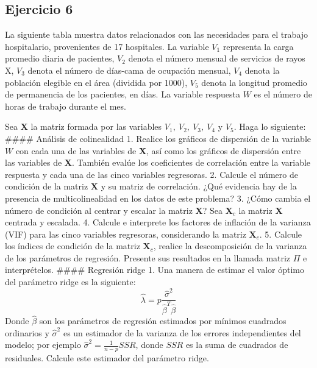 \documentclass[11pt]{article}
\begin{document}
    \hypertarget{ejercicio-6}{%
\subsection{Ejercicio 6}\label{ejercicio-6}}

La siguiente tabla muestra datos relacionados con las necesidades para
el trabajo hospitalario, provenientes de 17 hospitales. La variable
\(V_1\) representa la carga promedio diaria de pacientes, \(V_2\) denota
el número mensual de servicios de rayos X, \(V_3\) denota el número de
días-cama de ocupación mensual, \(V_4\) denota la población elegible en
el área (dividida por 1000), \(V_5\) denota la longitud promedio de
permanencia de los pacientes, en días. La variable respuesta \(W\) es el
número de horas de trabajo durante el mes.

Sea \(\mathbf{X}\) la matriz formada por las variables
\(V_1,\ V_2,\ V_3,\ V_4\) y \(V_5\). Haga lo siguiente: \#\#\#\#
Análisis de colinealidad 1. Realice los gráficos de dispersión de la
variable \(W\) con cada una de las variables de \(\mathbf{X}\), así como
los gráficos de dispersión entre las variables de \(\mathbf{X}\).
También evalúe los coeficientes de correlación entre la variable
respuesta y cada una de las cinco variables regresoras. 2. Calcule el
número de condición de la matriz \(\mathbf{X}\) y su matriz de
correlación. ¿Qué evidencia hay de la presencia de multicolinealidad en
los datos de este problema? 3. ¿Cómo cambia el número de condición al
centrar y escalar la matriz \(\mathbf{X}\)? Sea \(\mathbf{X}_c\) la
matriz \(\mathbf{X}\) centrada y escalada. 4. Calcule e interprete los
factores de inflación de la varianza (VIF) para las cinco variables
regresoras, considerando la matriz \(\mathbf{X}_c\). 5. Calcule los
índices de condición de la matriz \(\mathbf{X}_c\), realice la
descomposición de la varianza de los parámetros de regresión. Presente
sus resultados en la llamada matriz \(\Pi\) e interprételos. \#\#\#\#
Regresión ridge 1. Una manera de estimar el valor óptimo del parámetro
ridge es la siguiente:
\[\hat{\lambda} = p\frac{\hat{\sigma}^2}{\hat{\beta}^T\hat{\beta}}\]
Donde \(\hat{\beta}\) son los parámetros de regresión estimados por
mínimos cuadrados ordinarios y \(\hat{\sigma}^2\) es un estimador de la
varianza de los errores independientes del modelo; por ejemplo
\(\hat{\sigma}^2 = \frac{1}{n-p}SSR\), donde \(SSR\) es la suma de
cuadrados de residuales. Calcule este estimador del parámetro ridge.
\end{document}
